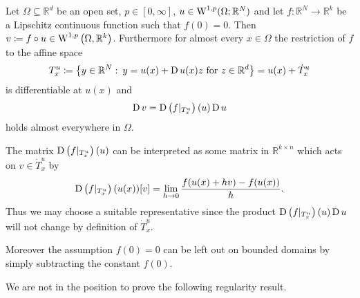 \begin{theorem}
	\label{chain_rule_for_distributional_derivatives}
	Let $ \Omega \subseteq \mathbb{ R }^{ d } $ be an open set, $ p \in [0, \infty ] $, $ u \in \operatorname{W}^{ 1, p } ( \Omega ; \mathbb{ R }^{ N } ) $ and let $ f \colon \mathbb{ R }^{ N } \to \mathbb{ R }^{ k } $ be a Lipschitz continuous function such that $ f ( 0 ) = 0 $. Then $ v \coloneqq f \circ u \in \operatorname{W}^{ 1, p } \left( \Omega , \mathbb{ R }^{ k } \right) $. Furthermore for almost every $ x \in \Omega $ the restriction of $ f $ to the affine space 
	\begin{equation*}
		T_{ x }^{ u }
		\coloneqq
		\left\{
			y \in \mathbb{ R }^{ N }
			\, \colon \,
			y = u ( x ) + \operatorname{D} u ( x ) z 
			\text{ for }
			z \in \mathbb{ R }^{ d }
		\right\}
		=
		u( x ) 
		+
		\dot{ T }_{ x }^{ u }
	\end{equation*}
	is differentiable at $ u( x ) $ and
	\begin{equation*}
		\operatorname{D} v 
		=
		\operatorname{D} \left(
			f |_{ T_{ x }^{ u } }
		\right) ( u ) 
		\operatorname{D} u 
	\end{equation*}
	holds almost everywhere in $ \Omega $.
\end{theorem}
\begin{remark}
	The matrix 	
	$\operatorname{D} \left(
	f |_{ T_{ x }^{ u } }
	\right) ( u ) 
	$
	can be interpreted as some matrix in $ \mathbb{ R }^{ k \times n } $ which acts on $ v \in \dot{ T }_{ x }^{ u } $ by
	\begin{equation*}
		\operatorname{D} \left(
		f |_{ T_{ x }^{ u } }
		\right) ( u ( x ) ) 
		[ v ]
		=
		\lim_{ h \to 0 }
			\frac{ f ( u ( x ) + h v ) - f ( u ( x ) ) }{ h }.
	\end{equation*}
	Thus we may choose a suitable representative since the product $ \operatorname{D} \left(
	f |_{ T_{ x }^{ u } }
	\right) ( u )  
	\operatorname{D} u $
	will not change by definition of $ \dot{ T }_{ x }^{ u } $.
	
	Moreover the assumption $ f( 0 ) = 0 $ can be left out on bounded domains by simply subtracting the constant $ f( 0 ) $.
\end{remark}

We are not in the position to prove the following regularity result.

